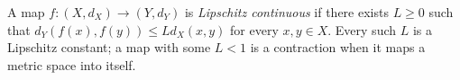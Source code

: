 
A map $f:(X,d_X)\to(Y,d_Y)$ is \emph{Lipschitz continuous} if there exists $L\ge0$ such that $d_Y(f(x),f(y))\le Ld_X(x,y)$ for every $x,y\in X$. Every such $L$ is a Lipschitz constant; a map with some $L<1$ is a contraction when it maps a metric space into itself.
